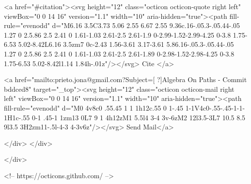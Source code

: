       <a  href="#citation"><svg height="12" class="octicon octicon-quote right left" viewBox="0 0 14 16" version="1.1" width="10" aria-hidden="true"><path fill-rule="evenodd" d="M6.16 3.5C3.73 5.06 2.55 6.67 2.55 9.36c.16-.05.3-.05.44-.05 1.27 0 2.5.86 2.5 2.41 0 1.61-1.03 2.61-2.5 2.61-1.9 0-2.99-1.52-2.99-4.25 0-3.8 1.75-6.53 5.02-8.42L6.16 3.5zm7 0c-2.43 1.56-3.61 3.17-3.61 5.86.16-.05.3-.05.44-.05 1.27 0 2.5.86 2.5 2.41 0 1.61-1.03 2.61-2.5 2.61-1.89 0-2.98-1.52-2.98-4.25 0-3.8 1.75-6.53 5.02-8.42l1.14 1.84h-.01z"/></svg> Cite
      </a>

      <a href="mailto:prieto.jona@gmail.com?Subject=[ ?]Algebra On Paths - Commit bddced8" target="_top"><svg height="12" class="octicon octicon-mail right left" viewBox="0 0 14 16" version="1.1" width="10" aria-hidden="true"><path fill-rule="evenodd" d="M0 4v8c0 .55.45 1 1 1h12c.55 0 1-.45 1-1V4c0-.55-.45-1-1-1H1c-.55 0-1 .45-1 1zm13 0L7 9 1 4h12zM1 5.5l4 3-4 3v-6zM2 12l3.5-3L7 10.5 8.5 9l3.5 3H2zm11-.5l-4-3 4-3v6z"/></svg> Send Mail</a>

    </div>
  </div>

</div>

<!-- https://octicons.github.com/ -->





